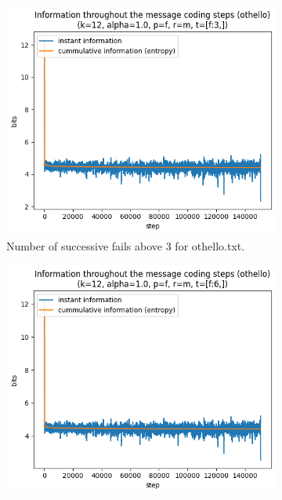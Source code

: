 \documentclass{article}
\begin{document}
\begin{figure}
    \begin{subfigure}[b]{0.3\textwidth}
        \begin{center}
            \includegraphics[width=1.0\linewidth]{../scripts/images/othello_12_1.0_f_m_[f:3,].png}
        \end{center}
        \caption{Number of successive fails above 3 for othello.txt.}
        \label{fig:othello-results-threshold-f-3}
    \end{subfigure}
    \hfill
    \begin{subfigure}[b]{0.3\textwidth}
        \begin{center}
            \includegraphics[width=1.0\linewidth]{../scripts/images/othello_12_1.0_f_m_[f:6,].png}

\end{center}
\end{subfigure}
\end{figure}
\end{document}
